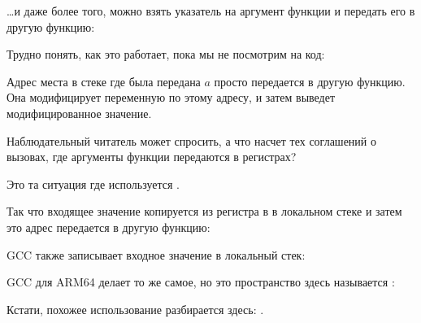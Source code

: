 \label{pointer_to_argument}

\dots и даже более того, можно взять указатель на аргумент функции и передать его в другую функцию:



Трудно понять, как это работает, пока мы не посмотрим на код:



Адрес места в стеке где была передана $a$ просто передается в другую функцию.
Она модифицирует переменную по этому адресу, и затем \printf выведет модифицированное значение.

\par Наблюдательный читатель может спросить, а что насчет тех соглашений о вызовах, где аргументы функции
передаются в регистрах?

Это та ситуация где используется .

Так что входящее значение копируется из регистра в  в локальном стеке и затем это адрес
передается в другую функцию:



GCC также записывает входное значение в локальный стек:



GCC для ARM64 делает то же самое, но это пространство здесь называется :



Кстати, похожее использование  разбирается здесь: .

